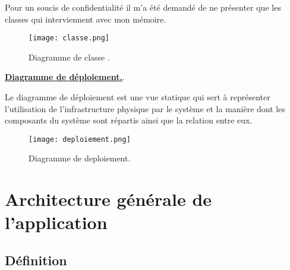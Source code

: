 Pour un soucis de confidentialité il m'a été demandé de ne présenter que les classes qui interviennent avec mon mémoire.

\begin{figure}[H]
	\centering
	\texttt{[image: classe.png]}
	\caption{Diagramme de classe .}
	\label{fig:sp0}
\end{figure}

\textbf{\underline{Diagramme de déploiement.}}.

Le diagramme de déploiement est une vue statique qui sert à représenter l’utilisation de l’infrastructure physique par le système et la manière dont les composants du système sont répartis ainsi que la relation entre eux.

\begin{figure}[H]
	\centering
	\texttt{[image: deploiement.png]}
	\caption{Diagramme de deploiement.}
	\label{fig:sp0}
\end{figure}

\section{Architecture générale de l'application}
\subsection{Définition}

